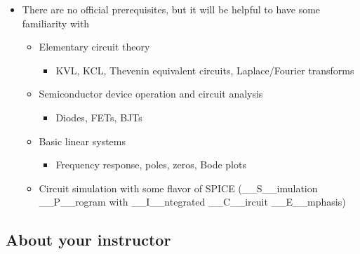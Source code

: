 \documentclass[11pt]{article}
\providecommand{\tightlist}{%
      \setlength{\itemsep}{0pt}\setlength{\parskip}{0pt}}
\begin{document}
    \begin{itemize}
\tightlist
\item
  There are no official prerequisites, but it will be helpful to have
  some familiarity with

  \begin{itemize}
  \tightlist
  \item
    Elementary circuit theory

    \begin{itemize}
    \tightlist
    \item
      KVL, KCL, Thevenin equivalent circuits, Laplace/Fourier transforms
    \end{itemize}
  \item
    Semiconductor device operation and circuit analysis

    \begin{itemize}
    \tightlist
    \item
      Diodes, FETs, BJTs
    \end{itemize}
  \item
    Basic linear systems

    \begin{itemize}
    \tightlist
    \item
      Frequency response, poles, zeros, Bode plots
    \end{itemize}
  \item
    Circuit simulation with some flavor of SPICE (\_\_S\_\_imulation
    \_\_P\_\_rogram with \_\_I\_\_ntegrated \_\_C\_\_ircuit
    \_\_E\_\_mphasis)
  \end{itemize}
\end{itemize}

    \hypertarget{about-your-instructor}{%
\subsection{About your instructor}\label{about-your-instructor}}
\end{document}
